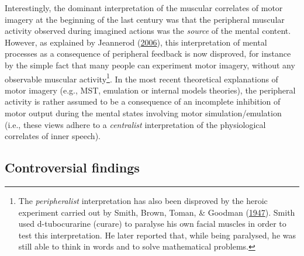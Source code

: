 \documentclass[a4paper,12pt,twoside,openright,oldfontcommands]{memoir}
\let\rmarkdownfootnote\footnote%
\def\footnote{\protect\rmarkdownfootnote}
\begin{document}
Interestingly, the dominant interpretation of the muscular correlates of
motor imagery at the beginning of the last century was that the
peripheral muscular activity observed during imagined actions was the
\emph{source} of the mental content. However, as explained by Jeannerod
(\protect\hyperlink{ref-jeannerod_motor_2006}{2006}), this
interpretation of mental processes as a consequence of peripheral
feedback is now disproved, for instance by the simple fact that many
people can experiment motor imagery, without any observable muscular
activity\footnote{The \emph{peripheralist} interpretation has also been
  disproved by the heroic experiment carried out by Smith, Brown, Toman,
  \& Goodman (\protect\hyperlink{ref-smith_lack_1947}{1947}). Smith used
  d-tubocurarine (curare) to paralyse his own facial muscles in order to
  test this interpretation. He later reported that, while being
  paralysed, he was still able to think in words and to solve
  mathematical problems.}. In the most recent theoretical explanations
of motor imagery (e.g., MST, emulation or internal models theories), the
peripheral activity is rather assumed to be a consequence of an
incomplete inhibition of motor output during the mental states involving
motor simulation/emulation (i.e., these views adhere to a
\emph{centralist} interpretation of the physiological correlates of
inner speech).

\subsection{Controversial findings}\label{controversial-findings}
\end{document}
